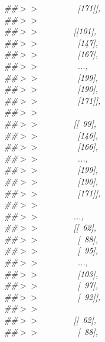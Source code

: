 \mbox{}\textit{\#\#$>$$>$\ \ \ \ \ \ \ \ \ [171]],} \\
\mbox{}\textit{\#\#$>$$>$\ } \\
\mbox{}\textit{\#\#$>$$>$\ \ \ \ \ \ \ \ [[101],} \\
\mbox{}\textit{\#\#$>$$>$\ \ \ \ \ \ \ \ \ [147],} \\
\mbox{}\textit{\#\#$>$$>$\ \ \ \ \ \ \ \ \ [167],} \\
\mbox{}\textit{\#\#$>$$>$\ \ \ \ \ \ \ \ \ ...,\ } \\
\mbox{}\textit{\#\#$>$$>$\ \ \ \ \ \ \ \ \ [199],} \\
\mbox{}\textit{\#\#$>$$>$\ \ \ \ \ \ \ \ \ [190],} \\
\mbox{}\textit{\#\#$>$$>$\ \ \ \ \ \ \ \ \ [171]],} \\
\mbox{}\textit{\#\#$>$$>$\ } \\
\mbox{}\textit{\#\#$>$$>$\ \ \ \ \ \ \ \ [[\ 99],} \\
\mbox{}\textit{\#\#$>$$>$\ \ \ \ \ \ \ \ \ [146],} \\
\mbox{}\textit{\#\#$>$$>$\ \ \ \ \ \ \ \ \ [166],} \\
\mbox{}\textit{\#\#$>$$>$\ \ \ \ \ \ \ \ \ ...,\ } \\
\mbox{}\textit{\#\#$>$$>$\ \ \ \ \ \ \ \ \ [199],} \\
\mbox{}\textit{\#\#$>$$>$\ \ \ \ \ \ \ \ \ [190],} \\
\mbox{}\textit{\#\#$>$$>$\ \ \ \ \ \ \ \ \ [171]],} \\
\mbox{}\textit{\#\#$>$$>$\ } \\
\mbox{}\textit{\#\#$>$$>$\ \ \ \ \ \ \ \ ...,\ } \\
\mbox{}\textit{\#\#$>$$>$\ \ \ \ \ \ \ \ [[\ 62],} \\
\mbox{}\textit{\#\#$>$$>$\ \ \ \ \ \ \ \ \ [\ 88],} \\
\mbox{}\textit{\#\#$>$$>$\ \ \ \ \ \ \ \ \ [\ 95],} \\
\mbox{}\textit{\#\#$>$$>$\ \ \ \ \ \ \ \ \ ...,\ } \\
\mbox{}\textit{\#\#$>$$>$\ \ \ \ \ \ \ \ \ [103],} \\
\mbox{}\textit{\#\#$>$$>$\ \ \ \ \ \ \ \ \ [\ 97],} \\
\mbox{}\textit{\#\#$>$$>$\ \ \ \ \ \ \ \ \ [\ 92]],} \\
\mbox{}\textit{\#\#$>$$>$\ } \\
\mbox{}\textit{\#\#$>$$>$\ \ \ \ \ \ \ \ [[\ 62],} \\
\mbox{}\textit{\#\#$>$$>$\ \ \ \ \ \ \ \ \ [\ 88],} \\
